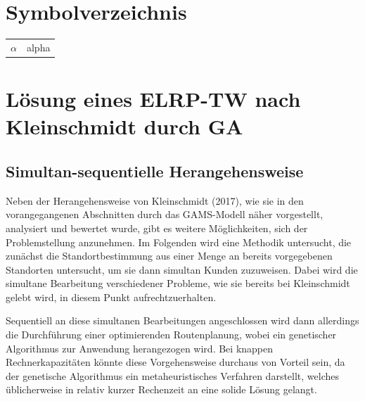 \documentclass[a4paper,12pt,parskip,bibtotoc,liststotoc]{article}
\begin{document}
\section*{Symbolverzeichnis}
\begin{table}[h!]
    \vspace*{-3mm}
    \hspace*{2mm}
  \renewcommand{\arraystretch}{1,5}
    \begin{tabular}{ll}  %
     $\alpha$	& alpha\\     %
	\end{tabular}
\end{table}

\newpage




\section{Lösung eines ELRP-TW nach Kleinschmidt durch GA}


\subsection{Simultan-sequentielle Herangehensweise}

Neben der Herangehensweise von Kleinschmidt (2017), wie sie in den vorangegangenen Abschnitten durch das GAMS-Modell näher vorgestellt, analysiert und bewertet wurde, gibt es weitere Möglichkeiten, sich der Problemstellung anzunehmen.
Im Folgenden wird eine Methodik untersucht, die zunächst die Standortbestimmung aus einer Menge an bereits vorgegebenen Standorten untersucht, um sie dann simultan Kunden zuzuweisen.
Dabei wird die simultane Bearbeitung verschiedener Probleme, wie sie bereits bei Kleinschmidt gelebt wird, in diesem Punkt aufrechtzuerhalten.

Sequentiell an diese simultanen Bearbeitungen angeschlossen wird dann allerdings die Durchführung einer optimierenden Routenplanung, wobei ein genetischer Algorithmus zur Anwendung herangezogen wird.
Bei knappen Rechnerkapazitäten könnte diese Vorgehensweise durchaus von Vorteil sein, da der genetische Algorithmus ein metaheuristisches Verfahren darstellt, welches üblicherweise in relativ kurzer Rechenzeit an eine solide Lösung gelangt.
\end{document}
